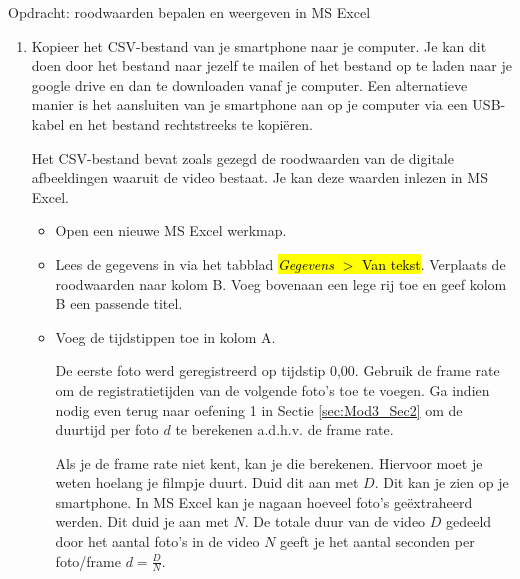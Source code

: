 \begin{opdracht}{Opdracht: roodwaarden bepalen en weergeven in MS Excel}
\begin{enumerate}
\begin{itemize}
			Het csv-bestand zou moeten opgeslaan worden op je smartphone in de map AppInventor/data.
			
			Ga na dat het CSV-bestand inderdaad op de voorziene plaats en onder de voorziene naam opgeslaan is op je smartphone. Je kan navigeren door de bestanden op je smartphone via de app \textquotedblleft Bestanden\textquotedblright, die normaal gezien standaard ge\"installeerd is op Android smartphones.
			
			
		\end{itemize}
	
	\item Kopieer het CSV-bestand van je smartphone naar je computer. Je kan dit doen door het bestand naar jezelf te mailen of het bestand op te laden naar je google drive en dan te downloaden vanaf je computer. Een alternatieve manier is het aansluiten van je smartphone aan op je computer via een USB-kabel en het bestand rechtstreeks te kopi\"eren. 
	
	Het CSV-bestand bevat zoals gezegd de roodwaarden van de digitale afbeeldingen waaruit de video bestaat. Je kan deze waarden inlezen in MS Excel. 
	
	\begin{itemize}
		\item Open een nieuwe MS Excel werkmap.
		\item Lees de gegevens in via het tabblad \hl{\emph{Gegevens} $>$ Van tekst}. Verplaats de roodwaarden naar kolom B. Voeg bovenaan een lege rij toe en geef kolom B een passende titel.
		\item Voeg de tijdstippen toe in kolom A. 
		
		De eerste foto werd geregistreerd op tijdstip 0,00. Gebruik de frame rate om de registratietijden van de volgende foto's toe te voegen. Ga indien nodig even terug naar oefening 1 in Sectie \ref{sec:Mod3_Sec2} om de duurtijd per foto $d$ te berekenen a.d.h.v. de frame rate.
		
		Als je de frame rate niet kent, kan je die berekenen. Hiervoor moet je weten hoelang je filmpje duurt. Duid dit aan met $D$. Dit kan je zien op je smartphone. In MS Excel kan je nagaan hoeveel foto's ge\"extraheerd werden. Dit duid je aan met $N$. De totale duur van de video $D$ gedeeld door het aantal foto's in de video $N$ geeft je het aantal seconden per foto/frame $d=\frac{D}{N}$. 
		

\end{itemize}
\end{enumerate}
\end{opdracht}
